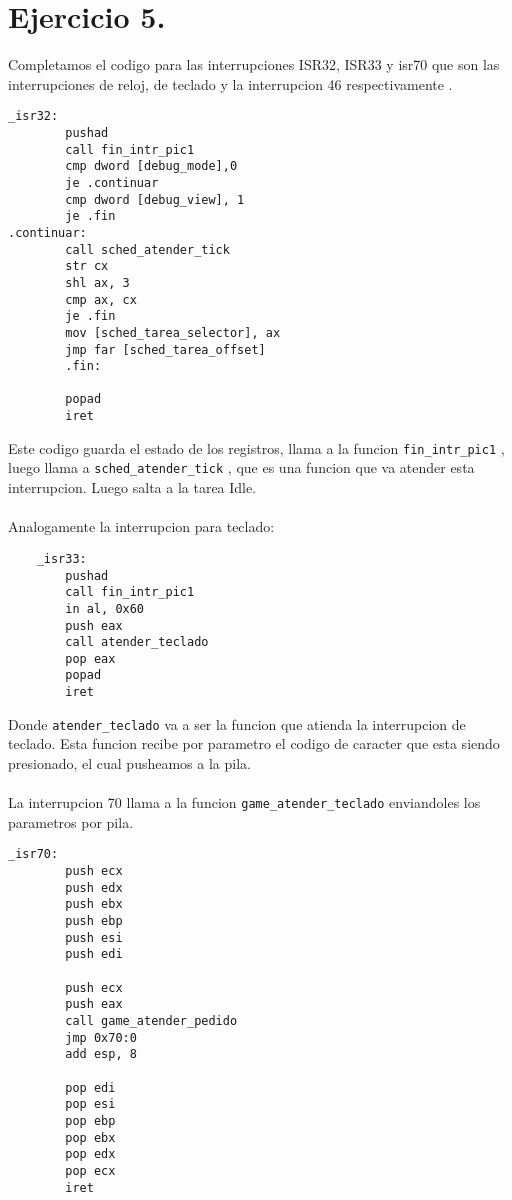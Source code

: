 \section{Ejercicio 5.}

\noindent Completamos el codigo para las interrupciones ISR32, ISR33 y isr70 que son las interrupciones de reloj, de teclado y la interrupcion 46 respectivamente .


\begin{codesnippet}
\begin{verbatim}
_isr32:
        pushad
        call fin_intr_pic1
        cmp dword [debug_mode],0
        je .continuar
        cmp dword [debug_view], 1
        je .fin
.continuar:        
        call sched_atender_tick
        str cx
        shl ax, 3
        cmp ax, cx
        je .fin
        mov [sched_tarea_selector], ax
        jmp far [sched_tarea_offset]
        .fin:
        
        popad  
        iret 
		\end{verbatim}
\end{codesnippet}

\noindent Este codigo  guarda el estado de los registros, llama a la funcion \texttt{fin\_intr\_pic1} ,  luego llama a \texttt{sched\_atender\_tick} , que es una funcion que va atender esta interrupcion. Luego salta a la tarea Idle.\\
\\
Analogamente la interrupcion para teclado:

\begin{codesnippet}
\begin{verbatim}
    _isr33:
        pushad
        call fin_intr_pic1
        in al, 0x60
        push eax
        call atender_teclado
        pop eax
        popad  
        iret    
    \end{verbatim}
\end{codesnippet}

\noindent Donde \texttt{atender\_teclado} va a ser la funcion que atienda la interrupcion de teclado. Esta funcion recibe por parametro el codigo de caracter que esta siendo presionado, el cual pusheamos a la pila.
\\
\\
La interrupcion 70 llama a la funcion \texttt{game\_atender\_teclado} enviandoles los parametros por pila.
\begin{codesnippet}
\begin{verbatim}
_isr70:
        push ecx
        push edx
        push ebx
        push ebp
        push esi
        push edi

        push ecx
        push eax
        call game_atender_pedido
        jmp 0x70:0
        add esp, 8

        pop edi
        pop esi
        pop ebp
        pop ebx
        pop edx
        pop ecx
        iret    
    \end{verbatim}
\end{codesnippet}

